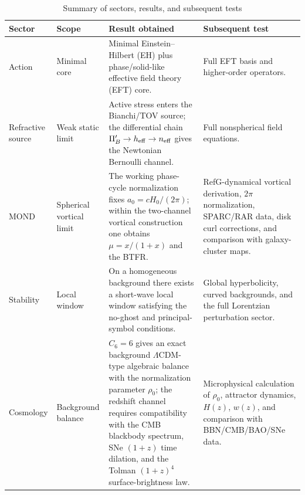 \documentclass[12pt]{article}
\begin{document}
\begin{table}[htbp]
\centering
\caption{Summary of sectors, results, and subsequent tests}
\label{tab:observational-summary}
\scriptsize
\setlength{\tabcolsep}{3pt}
\begin{tabularx}{\textwidth}{@{}>{\raggedright\arraybackslash}p{}>{\raggedright\arraybackslash}p{}XX@{}}
\toprule
Sector & Scope & Result obtained & Subsequent test \\
\midrule
Action & Minimal core &
Minimal Einstein--Hilbert (EH) plus phase/solid-like effective field theory (EFT) core. &
Full EFT basis and higher-order operators. \\

Refractive source & Weak static limit &
Active stress enters the Bianchi/TOV source; the differential chain $\Pi_B'\to h_{\rm eff}\to n_{\rm eff}$ gives the Newtonian Bernoulli channel. &
Full nonspherical field equations. \\

MOND & Spherical vortical limit &
The working phase-cycle normalization fixes $a_0=cH_0/(2\pi)$; within the two-channel vortical construction one obtains $\mu=x/(1+x)$ and the BTFR. &
RefG-dynamical vortical derivation, $2\pi$ normalization, SPARC/RAR data, disk curl corrections, and comparison with galaxy-cluster maps. \\

Stability & Local window &
On a homogeneous background there exists a short-wave local window satisfying the no-ghost and principal-symbol conditions. &
Global hyperbolicity, curved backgrounds, and the full Lorentzian perturbation sector. \\

Cosmology & Background balance &
$C_6=6$ gives an exact background $\Lambda$CDM-type algebraic balance with the normalization parameter $\rho_0$; the redshift channel requires compatibility with the CMB blackbody spectrum, SNe $(1+z)$ time dilation, and the Tolman $(1+z)^4$ surface-brightness law. &
Microphysical calculation of $\rho_0$, attractor dynamics, $H(z)$, $w(z)$, and comparison with BBN/CMB/BAO/SNe data. \\
\bottomrule
\end{tabularx}
\end{table}
\end{document}
